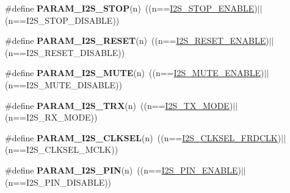 \begin{DoxyCompactItemize}
\item 
\hypertarget{group___i2_s___private___macros_ga6af3b476d150f28900260915e74ab91f}{\#define {\bfseries \-P\-A\-R\-A\-M\-\_\-\-I2\-S\-\_\-\-S\-T\-O\-P}(n)~((n==\hyperlink{group___i2_s___public___macros_gabe1e11f6f4ce8542408e466b3316ca3c}{\-I2\-S\-\_\-\-S\-T\-O\-P\-\_\-\-E\-N\-A\-B\-L\-E})$|$$|$(n==\-I2\-S\-\_\-\-S\-T\-O\-P\-\_\-\-D\-I\-S\-A\-B\-L\-E))}\label{group___i2_s___private___macros_ga6af3b476d150f28900260915e74ab91f}

\item 
\hypertarget{group___i2_s___private___macros_ga05c2096c5b756c320e26f716b65b971c}{\#define {\bfseries \-P\-A\-R\-A\-M\-\_\-\-I2\-S\-\_\-\-R\-E\-S\-E\-T}(n)~((n==\hyperlink{group___i2_s___public___macros_gae090c11fade3a6f9bf9791dba1920556}{\-I2\-S\-\_\-\-R\-E\-S\-E\-T\-\_\-\-E\-N\-A\-B\-L\-E})$|$$|$(n==\-I2\-S\-\_\-\-R\-E\-S\-E\-T\-\_\-\-D\-I\-S\-A\-B\-L\-E))}\label{group___i2_s___private___macros_ga05c2096c5b756c320e26f716b65b971c}

\item 
\hypertarget{group___i2_s___private___macros_ga77e074f0d33bf3b2e9069287d5221aa9}{\#define {\bfseries \-P\-A\-R\-A\-M\-\_\-\-I2\-S\-\_\-\-M\-U\-T\-E}(n)~((n==\hyperlink{group___i2_s___public___macros_ga3f418f8bc5e6f401481d3b9e241758bb}{\-I2\-S\-\_\-\-M\-U\-T\-E\-\_\-\-E\-N\-A\-B\-L\-E})$|$$|$(n==\-I2\-S\-\_\-\-M\-U\-T\-E\-\_\-\-D\-I\-S\-A\-B\-L\-E))}\label{group___i2_s___private___macros_ga77e074f0d33bf3b2e9069287d5221aa9}

\item 
\hypertarget{group___i2_s___private___macros_ga8ae66b5febc433801d93630f721b95d3}{\#define {\bfseries \-P\-A\-R\-A\-M\-\_\-\-I2\-S\-\_\-\-T\-R\-X}(n)~((n==\hyperlink{group___i2_s___public___macros_ga9a69048cf8ff0576f573ce0605a15753}{\-I2\-S\-\_\-\-T\-X\-\_\-\-M\-O\-D\-E})$|$$|$(n==\-I2\-S\-\_\-\-R\-X\-\_\-\-M\-O\-D\-E))}\label{group___i2_s___private___macros_ga8ae66b5febc433801d93630f721b95d3}

\item 
\hypertarget{group___i2_s___private___macros_ga690d267b617b0bb01e48782a2b9b369c}{\#define {\bfseries \-P\-A\-R\-A\-M\-\_\-\-I2\-S\-\_\-\-C\-L\-K\-S\-E\-L}(n)~((n==\hyperlink{group___i2_s___public___macros_gafe1dcaaac6d82875528aef5b6f77cc14}{\-I2\-S\-\_\-\-C\-L\-K\-S\-E\-L\-\_\-\-F\-R\-D\-C\-L\-K})$|$$|$(n==\-I2\-S\-\_\-\-C\-L\-K\-S\-E\-L\-\_\-\-M\-C\-L\-K))}\label{group___i2_s___private___macros_ga690d267b617b0bb01e48782a2b9b369c}

\item 
\hypertarget{group___i2_s___private___macros_ga63e6ca85e9d174f6d69fd6c1f0babcf8}{\#define {\bfseries \-P\-A\-R\-A\-M\-\_\-\-I2\-S\-\_\-P\-I\-N}(n)~((n==\hyperlink{group___i2_s___public___macros_ga5c513203b6ebe05f3c82b7cec3f16a7f}{\-I2\-S\-\_\-P\-I\-N\-\_\-\-E\-N\-A\-B\-L\-E})$|$$|$(n==\-I2\-S\-\_\-P\-I\-N\-\_\-\-D\-I\-S\-A\-B\-L\-E))}\label{group___i2_s___private___macros_ga63e6ca85e9d174f6d69fd6c1f0babcf8}


\end{DoxyCompactItemize}
